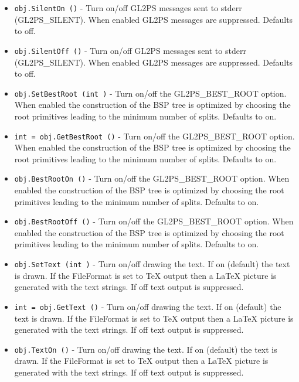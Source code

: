 \begin{itemize}
\item  \verb|obj.SilentOn ()| -  Turn on/off GL2PS messages sent to stderr (GL2PS\_SILENT).  When
 enabled GL2PS messages are suppressed.  Defaults to off.

\item  \verb|obj.SilentOff ()| -  Turn on/off GL2PS messages sent to stderr (GL2PS\_SILENT).  When
 enabled GL2PS messages are suppressed.  Defaults to off.

\item  \verb|obj.SetBestRoot (int )| -  Turn on/off the GL2PS\_BEST\_ROOT option.  When enabled the
 construction of the BSP tree is optimized by choosing the root
 primitives leading to the minimum number of splits.  Defaults to
 on.

\item  \verb|int = obj.GetBestRoot ()| -  Turn on/off the GL2PS\_BEST\_ROOT option.  When enabled the
 construction of the BSP tree is optimized by choosing the root
 primitives leading to the minimum number of splits.  Defaults to
 on.

\item  \verb|obj.BestRootOn ()| -  Turn on/off the GL2PS\_BEST\_ROOT option.  When enabled the
 construction of the BSP tree is optimized by choosing the root
 primitives leading to the minimum number of splits.  Defaults to
 on.

\item  \verb|obj.BestRootOff ()| -  Turn on/off the GL2PS\_BEST\_ROOT option.  When enabled the
 construction of the BSP tree is optimized by choosing the root
 primitives leading to the minimum number of splits.  Defaults to
 on.

\item  \verb|obj.SetText (int )| -  Turn on/off drawing the text.  If on (default) the text is drawn.
 If the FileFormat is set to TeX output then a LaTeX picture is
 generated with the text strings.  If off text output is
 suppressed.

\item  \verb|int = obj.GetText ()| -  Turn on/off drawing the text.  If on (default) the text is drawn.
 If the FileFormat is set to TeX output then a LaTeX picture is
 generated with the text strings.  If off text output is
 suppressed.

\item  \verb|obj.TextOn ()| -  Turn on/off drawing the text.  If on (default) the text is drawn.
 If the FileFormat is set to TeX output then a LaTeX picture is
 generated with the text strings.  If off text output is
 suppressed.


\end{itemize}
